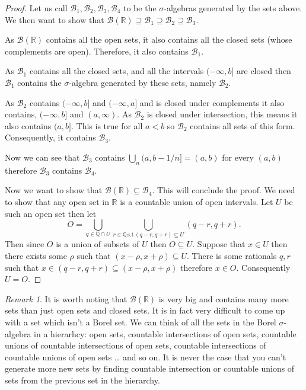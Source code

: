 \documentclass[
]{book}
\theoremstyle{definition}
\theoremstyle{definition}
\theoremstyle{definition}
\theoremstyle{definition}
\theoremstyle{remark}
\newtheorem*{remark}{Remark}
\begin{document}
\begin{proof}
Let us call \(\mathcal{B}_1, \mathcal{B}_2, \mathcal{B}_3, \mathcal{B}_4\) to be the \(\sigma\)-algebras generated by the sets above. We then want to show that \(\mathcal{B}(\mathbb{R}) \supseteq \mathcal{B}_1 \supseteq \mathcal{B}_2 \supseteq \mathcal{B}_3\).

As \(\mathcal{B}(\mathbb{R})\) contains all the open sets, it also contains all the closed sets (whose complements are open). Therefore, it also contains \(\mathcal{B}_1\).

As \(\mathcal{B}_1\) contains all the closed sets, and all the intervals \((-\infty, b]\) are closed then \(\mathcal{B}_1\) contains the \(\sigma\)-algebra generated by these sets, namely \(\mathcal{B}_2\).

As \(\mathcal{B}_2\) contains \((-\infty, b]\) and \((-\infty, a]\) and is closed under complements it also contains, \((-\infty, b]\) and \((a, \infty)\). As \(\mathcal{B}_2\) is closed under intersection, this means it also contains \((a,b]\). This is true for all \(a<b\) so \(\mathcal{B}_2\) contains all sets of this form. Consequently, it contains \(\mathcal{B}_3\).

Now we can see that \(\mathcal{B}_3\) contains \(\bigcup_n (a,b-1/n] = (a,b)\) for every \((a,b)\) therefore \(\mathcal{B}_3\) contains \(\mathcal{B}_4\).

Now we want to show that \(\mathcal{B}(\mathbb{R}) \subseteq \mathcal{B}_4\). This will conclude the proof. We need to show that any open set in \(\mathbb{R}\) is a countable union of open intervals. Let \(U\) be such an open set then let
\[ O = \bigcup_{q \in \mathbb{Q} \cap U} \bigcup_{r \in \mathbb{Q} \, \mbox{s.t} \, (q-r,q+r) \subseteq U} (q-r,q+r). \] Then since \(O\) is a union of subsets of \(U\) then \(O \subseteq U\). Suppose that \(x \in U\) then there exists some \(\rho\) such that \((x-\rho, x+\rho) \subseteq U\). There is some rationals \(q,r\) such that \(x \in (q-r,q+r) \subseteq (x-\rho,x+\rho)\) therefore \(x \in O\). Consequently \(U= O\).
\end{proof}

\begin{remark}
It is worth noting that \(\mathcal{B}(\mathbb{R})\) is very big and contains many more sets than just open sets and closed sets. It is in fact very difficult to come up with a set which isn't a Borel set. We can think of all the sets in the Borel \(\sigma\)-algebra in a hierarhcy: open sets, countable intersections of open sets, countable unions of countable intersections of open sets, countable intersections of countable unions of open sets \ldots{} and so on. It is never the case that you can't generate more new sets by finding countable intersection or countable unions of sets from the previous set in the hierarchy.
\end{remark}
\end{document}
